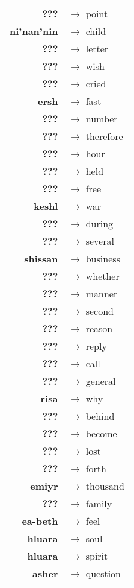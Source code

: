 \begin{tabular}{rl}
\textbf{???} & $\rightarrow$ point \\
\textbf{ni'nan'nin} & $\rightarrow$ child \\
\textbf{???} & $\rightarrow$ letter \\
\textbf{???} & $\rightarrow$ wish \\
\textbf{???} & $\rightarrow$ cried \\
\textbf{ersh} & $\rightarrow$ fast \\
\textbf{???} & $\rightarrow$ number \\
\textbf{???} & $\rightarrow$ therefore \\
\textbf{???} & $\rightarrow$ hour \\
\textbf{???} & $\rightarrow$ held \\
\textbf{???} & $\rightarrow$ free \\
\textbf{keshl} & $\rightarrow$ war \\
\textbf{???} & $\rightarrow$ during \\
\textbf{???} & $\rightarrow$ several \\
\textbf{shissan} & $\rightarrow$ business \\
\textbf{???} & $\rightarrow$ whether \\
\textbf{???} & $\rightarrow$ manner \\
\textbf{???} & $\rightarrow$ second \\
\textbf{???} & $\rightarrow$ reason \\
\textbf{???} & $\rightarrow$ reply \\
\textbf{???} & $\rightarrow$ call \\
\textbf{???} & $\rightarrow$ general \\
\textbf{risa} & $\rightarrow$ why \\
\textbf{???} & $\rightarrow$ behind \\
\textbf{???} & $\rightarrow$ become \\
\textbf{???} & $\rightarrow$ lost \\
\textbf{???} & $\rightarrow$ forth \\
\textbf{emiyr} & $\rightarrow$ thousand \\
\textbf{???} & $\rightarrow$ family \\
\textbf{ea-beth} & $\rightarrow$ feel \\
\textbf{hluara} & $\rightarrow$ soul \\
\textbf{hluara} & $\rightarrow$ spirit \\
\textbf{asher} & $\rightarrow$ question \\

\end{tabular}

